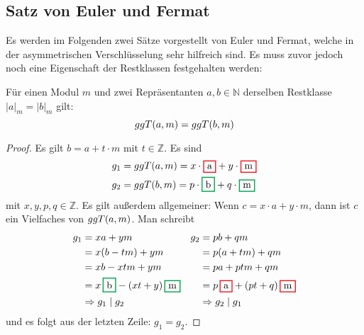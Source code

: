 \subsection{Satz von Euler und Fermat}
Es werden im Folgenden zwei Sätze vorgestellt von Euler und Fermat, welche
in der asymmetrischen Verschlüsselung sehr hilfreich sind. Es muss zuvor jedoch noch eine
Eigenschaft der Restklassen festgehalten werden:

\begin{satz}
  \label{satz:restklasse-ggt}
  Für einen Modul $m$ und zwei Repräsentanten $a,b \in \mathbb{N}$ derselben
  Restklasse $\vert a \vert_m = \vert b \vert_m$ gilt:
  \begin{equation*}
    ggT(a,m) = ggT(b,m)
  \end{equation*}
\end{satz}
\begin{proof}
  Es gilt $b = a + t \cdot m$ mit $t \in \mathbb{Z}$. Es sind
  \begin{align*}
    g_1 & = \ggt{a}{m} = x \cdot \hl{Red}{a} + y \cdot \hl{Red}{m}     \\
    g_2 & = \ggt{b}{m} = p \cdot \hl{Green}{b} + q \cdot \hl{Green}{m}
  \end{align*}
  mit $x,y,p,q \in \mathbb{Z}$. Es gilt außerdem allgemeiner: Wenn $c = x \cdot a + y \cdot m$,
  dann ist $c$ ein Vielfaches von $ggT(a,m)$.
  Man schreibt
  \begin{align*}
    g_1 & = xa + ym                                    & g_2 & = pb + qm                                \\
        & = x(b - tm) + ym                             &     & = p(a + tm) + qm                         \\
        & = xb - xtm + ym                              &     & = pa + ptm + qm                          \\
        & = x\,\hl{Green}{b} - (xt + y)\,\hl{Green}{m} &     & = p\,\hl{Red}{a} + (pt + q)\,\hl{Red}{m} \\
        & \Rightarrow g_1 \mid g_2                     &     & \Rightarrow g_2 \mid g_1
  \end{align*}
  und es folgt aus der letzten Zeile: $g_1 = g_2$.
\end{proof}


